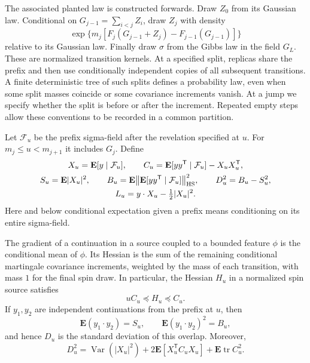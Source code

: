 The associated planted law is constructed forwards. Draw $Z_0$ from its
Gaussian law. Conditional on $G_{j-1}=\sum_{i<j}Z_i$, draw $Z_j$ with
density
\[
 \exp\{m_j[F_j(G_{j-1}+Z_j)-F_{j-1}(G_{j-1})]\}
\]
relative to its Gaussian law. Finally draw $\sigma$ from the Gibbs law
in the field $G_L$. These are normalized transition kernels. At a
specified split, replicas share the prefix and then use conditionally
independent copies of all subsequent transitions. A finite deterministic
tree of such splits defines a probability law, even when some split
masses coincide or some covariance increments vanish. At a jump we
specify whether the split is before or after the increment. Repeated
empty steps allow these conventions to be recorded in a common partition.

Let $\mathcal F_u$ be the prefix sigma-field after the revelation specified
at $u$. For $m_j\leq u<m_{j+1}$ it includes $G_j$. Define
\[
 \begin{gathered}
 X_u=\mathbf E[y\mid\mathcal F_u],\qquad
 C_u=\mathbf E[yy^{\mathsf T}\mid\mathcal F_u]-X_uX_u^{\mathsf T},\\
 S_u=\mathbf E|X_u|^2,\qquad
 B_u=\mathbf E\bigl\|\mathbf E[yy^{\mathsf T}\mid\mathcal F_u]\bigr\|_{\rm HS}^2,
 \qquad D_u^2=B_u-S_u^2,\\
 L_u=y\cdot X_u-\tfrac12|X_u|^2.
 \end{gathered}
\]
Here and below conditional expectation given a prefix means conditioning
on its entire sigma-field.

\begin{lemma}\label{lem:found-source}
The gradient of a continuation in a source coupled to a bounded feature
$\phi$ is the conditional mean of $\phi$. Its Hessian is the sum of the
remaining conditional martingale covariance increments, weighted by the
mass of each transition, with mass $1$ for the final spin draw. In
particular, the Hessian $H_u$ in a normalized spin source satisfies
\[
 uC_u\preceq H_u\preceq C_u.
\]
If $y_1,y_2$ are independent continuations from the prefix at $u$, then
\[
 \mathbf E(y_1\cdot y_2)=S_u,\qquad
 \mathbf E(y_1\cdot y_2)^2=B_u,
\]
and hence $D_u$ is the standard deviation of this overlap. Moreover,
\[
 D_u^2=\operatorname{Var}(|X_u|^2)
       +2\mathbf E[X_u^{\mathsf T}C_uX_u]
       +\mathbf E\operatorname{tr}C_u^2.
\]
\end{lemma}

